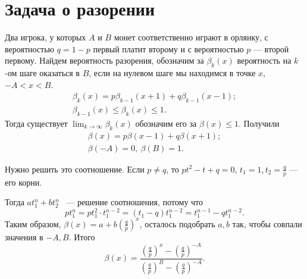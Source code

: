 \section{Задача о разорении}

\begin{example}

    Два игрока, у которых $A$ и $B$ монет соответственно играют в орлянку, с вероятностью $q=1-p$ первый платит второму и с вероятностью $p$
      --- второй первому.
      Найдем вероятность разорения, обозначим за $\beta_k(x)$ вероятность на $k$-ом шаге
      оказаться в $B$, если на нулевом шаге мы находимся в точке $x$, $-A < x < B$.
      \begin{gather*}
          \beta_k(x) = p\beta_{k - 1}(x + 1) + q\beta_{k -1}(x-1);\\
          \beta_{k - 1}(x) \le \beta_k(x) \le 1.
      \end{gather*}
     Тогда существует 
     $\lim_{k\rightarrow\infty}\beta_k(x)$ обозначим его за $\beta(x) \le 1.$
      Получили
      \begin{gather*}
          \beta(x) = p\beta(x - 1) + q\beta(x +1);\\
          \beta(-A) = 0, \ \beta(B) = 1.
      \end{gather*}
 
      Нужно решить это соотношение.
      Если $p\neq q$, то $pt^2 - t + q = 0$, $t_1 = 1, t_2 = \frac{q}{p}$ ---  его корни.
 
      Тогда $at_1^n + bt_2^n$ ~--- решение соотношения, потому что 
      $$pt_1^n = pt_1^2\cdot t_1^{n - 2} =
          (t_1 - q)t_1^{n - 2} = t_1^{n - 1} - qt_1^{n - 2}.$$
     Таким образом,
      $\beta(x) = a + b(\frac{q}{p})^x$, осталось подобрать $a, b$ так, чтобы совпали значения в $-A, B$. Итого $$\beta(x) = \frac{(\frac{q}{p})^x - (\frac{q}{p})^{-A}}{(\frac{q}{p})^B - (\frac{q}{p})^{-A}}.$$
     
  \end{example}\newpage
